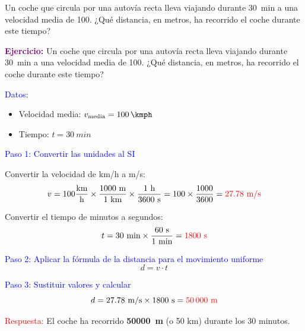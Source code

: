 \begin{exercise}
    Un coche que circula por una autovía recta lleva viajando durante \qty{30}{min} a una velocidad media de \qty{100}{\kmph}. ¿Qué distancia, en metros, ha recorrido el coche durante este tiempo?
    \begin{solu}
        \textbf{\textcolor{purple}{Ejercicio:}} Un coche que circula por una autovía recta lleva viajando durante \qty{30}{min} a una velocidad media de \qty{100}{\kmph}. ¿Qué distancia, en metros, ha recorrido el coche durante este tiempo?

        \vspace{0.3cm}

        \textcolor{blue}{Datos:}
        \begin{itemize}
            \item Velocidad media: $v_{\text{media}} = \qty{100}{\kmph}$
            \item Tiempo: $t = \qty{30}{min}$
        \end{itemize}

        \textcolor{blue}{Paso 1: Convertir las unidades al SI}

        Convertir la velocidad de km/h a m/s:
        \[
            v = 100 \frac{\text{km}}{\text{h}} \times \frac{1000 \text{ m}}{1 \text{ km}} \times \frac{1 \text{ h}}{3600 \text{ s}} = 100 \times \frac{1000}{3600} = \textcolor{red}{27.78 \text{ m/s}}
        \]

        Convertir el tiempo de minutos a segundos:
        \[
            t = 30 \text{ min} \times \frac{60 \text{ s}}{1 \text{ min}} = \textcolor{red}{1800 \text{ s}}
        \]

        \textcolor{blue}{Paso 2: Aplicar la fórmula de la distancia para el movimiento uniforme}
        \[
            \boxed{d = v \cdot t}
        \]

        \textcolor{blue}{Paso 3: Sustituir valores y calcular}
        \[
            d = 27.78 \text{ m/s} \times 1800 \text{ s} = \textcolor{red}{50\,000 \text{ m}}
        \]

        \textcolor{red}{Respuesta:} El coche ha recorrido \textbf{\qty{50000}{\m}} (o 50 km) durante los 30 minutos.
    \end{solu}
\end{exercise}


